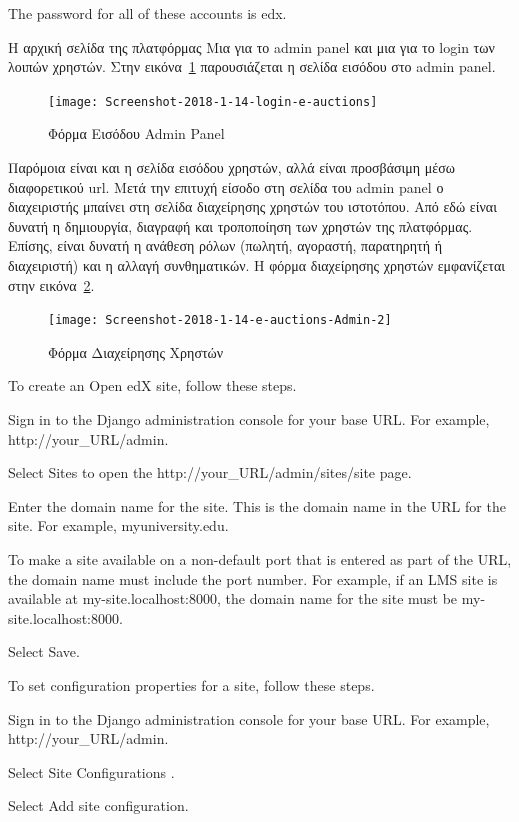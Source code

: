 \documentclass[12pt]{report}
\begin{document}
The password for all of these accounts is edx.


Η αρχική σελίδα της πλατφόρμας \textlatin{} Μια για το \textlatin{admin panel} και μια για το \textlatin{login} των λοιπών χρηστών. Στην εικόνα~\ref{fig:login_1} παρουσιάζεται η σελίδα εισόδου στο \textlatin{admin panel}.
\begin{figure}[H]
\centering
\texttt{[image: Screenshot-2018-1-14-login-e-auctions]}
\caption{Φόρμα Εισόδου \textlatin{Admin Panel}}
\label{fig:login_1}
\end{figure}

Παρόμοια είναι και η σελίδα εισόδου χρηστών, αλλά είναι προσβάσιμη μέσω διαφορετικού \textlatin{url}. Μετά την επιτυχή είσοδο στη σελίδα του \textlatin{admin panel} ο διαχειριστής μπαίνει στη σελίδα διαχείρησης χρηστών του ιστοτόπου. Από εδώ είναι δυνατή η δημιουργία, διαγραφή και τροποποίηση των χρηστών της πλατφόρμας. Επίσης, είναι δυνατή η ανάθεση ρόλων (πωλητή, αγοραστή, παρατηρητή ή διαχειριστή) και η αλλαγή συνθηματικών. Η φόρμα διαχείρησης χρηστών εμφανίζεται στην εικόνα~\ref{fig:user_admin}.
\begin{figure}[H]
\centering
\texttt{[image: Screenshot-2018-1-14-e-auctions-Admin-2]}
\caption{Φόρμα Διαχείρησης Χρηστών}
\label{fig:user_admin}
\end{figure}
To create an Open edX site, follow these steps.

    Sign in to the Django administration console for your base URL. For example, http://{your_URL}/admin.

    Select Sites to open the http://{your_URL}/admin/sites/site page.

    Enter the domain name for the site. This is the domain name in the URL for the site. For example, myuniversity.edu.

    To make a site available on a non-default port that is entered as part of the URL, the domain name must include the port number. For example, if an LMS site is available at my-site.localhost:8000, the domain name for the site must be my-site.localhost:8000.

    Select Save.

To set configuration properties for a site, follow these steps.

    Sign in to the Django administration console for your base URL. For example, http://{your_URL}/admin.

    Select Site Configurations .

    Select Add site configuration.
\end{document}
